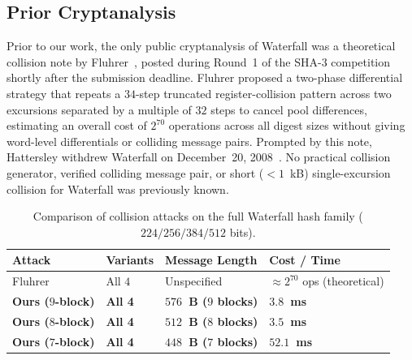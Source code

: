 \documentclass[11pt,a4paper]{article}
\theoremstyle{definition}
\theoremstyle{remark}
\begin{document}
\subsection{Prior Cryptanalysis}
Prior to our work, the only public cryptanalysis of Waterfall was a theoretical collision note by Fluhrer~\cite{Flu08}, posted during Round~1 of the SHA-3 competition shortly after the submission deadline. Fluhrer proposed a two-phase differential strategy that repeats a $34$-step truncated register-collision pattern across two excursions separated by a multiple of $32$ steps to cancel pool differences, estimating an overall cost of $2^{70}$ operations across all digest sizes without giving word-level differentials or colliding message pairs. Prompted by this note, Hattersley withdrew Waterfall on December~20, 2008~\cite{Hat08b}. No practical collision generator, verified colliding message pair, or short ($< 1$~kB) single-excursion collision for Waterfall was previously known.

\begin{table}[t]
\centering
\caption{Comparison of collision attacks on the full Waterfall hash family ($224/256/384/512$ bits).}
\label{tab:comparison}
\small
\setlength{\tabcolsep}{9pt}
\begin{tabular}{@{}llll@{}}
\toprule
\textbf{Attack} & \textbf{Variants} & \textbf{Message Length} & \textbf{Cost / Time} \\
\midrule
Fluhrer~\cite{Flu08} & All $4$ & Unspecified & $\approx 2^{70}$ ops (theoretical) \\
\midrule
\textbf{Ours ($9$-block)} & \textbf{All 4} & \textbf{$576$~B ($9$ blocks)} & \textbf{$3.8$~ms} \\
\textbf{Ours ($8$-block)} & \textbf{All 4} & \textbf{$512$~B ($8$ blocks)} & \textbf{$3.5$~ms} \\
\textbf{Ours ($7$-block)} & \textbf{All 4} & \textbf{$448$~B ($7$ blocks)} & \textbf{$52.1$~ms} \\
\bottomrule
\end{tabular}
\end{table}
\end{document}

